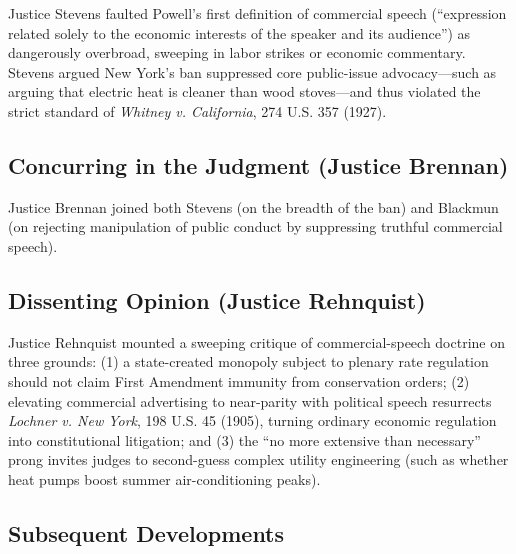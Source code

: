 \documentclass[12pt]{article}
\begin{document}
Justice Stevens faulted Powell's first definition of commercial speech (``expression related solely to the economic interests of the speaker and its audience'') as dangerously overbroad, sweeping in labor strikes or economic commentary. Stevens argued New York's ban suppressed core public-issue advocacy---such as arguing that electric heat is cleaner than wood stoves---and thus violated the strict standard of \textit{Whitney v. California}, 274 U.S. 357 (1927).

\subsection{Concurring in the Judgment (Justice Brennan)}

Justice Brennan joined both Stevens (on the breadth of the ban) and Blackmun (on rejecting manipulation of public conduct by suppressing truthful commercial speech).

\subsection{Dissenting Opinion (Justice Rehnquist)}

Justice Rehnquist mounted a sweeping critique of commercial-speech doctrine on three grounds: (1) a state-created monopoly subject to plenary rate regulation should not claim First Amendment immunity from conservation orders; (2) elevating commercial advertising to near-parity with political speech resurrects \textit{Lochner v. New York}, 198 U.S. 45 (1905), turning ordinary economic regulation into constitutional litigation; and (3) the ``no more extensive than necessary'' prong invites judges to second-guess complex utility engineering (such as whether heat pumps boost summer air-conditioning peaks).

\subsection{Subsequent Developments}
\end{document}
